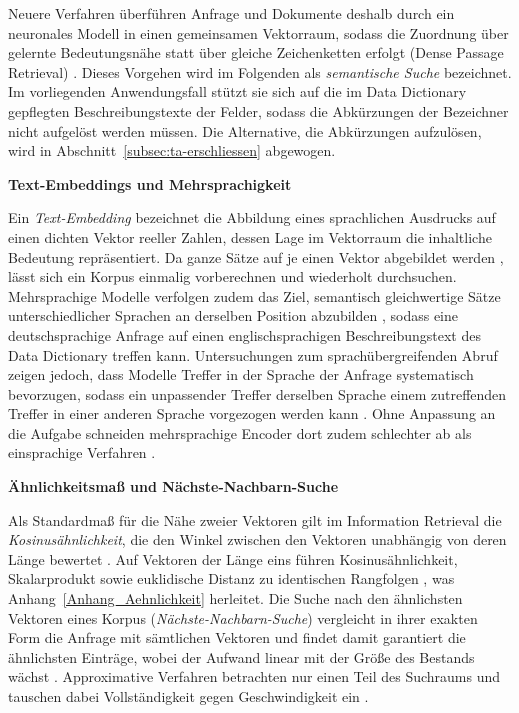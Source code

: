 Neuere Verfahren überführen Anfrage und Dokumente deshalb durch ein neuronales Modell in einen gemeinsamen Vektorraum, sodass die Zuordnung über gelernte Bedeutungsnähe statt über gleiche Zeichenketten erfolgt (Dense Passage Retrieval) \cite{karpukhin_dense_2020}. Dieses Vorgehen wird im Folgenden als \emph{semantische Suche} bezeichnet. Im vorliegenden Anwendungsfall stützt sie sich auf die im Data Dictionary gepflegten Beschreibungstexte der Felder, sodass die Abkürzungen der Bezeichner nicht aufgelöst werden müssen. Die Alternative, die Abkürzungen aufzulösen, wird in Abschnitt~\ref{subsec:ta-erschliessen} abgewogen.

\textbf{Text-Embeddings und Mehrsprachigkeit}

Ein \emph{Text-Embedding} bezeichnet die Abbildung eines sprachlichen Ausdrucks auf einen dichten Vektor reeller Zahlen, dessen Lage im Vektorraum die inhaltliche Bedeutung repräsentiert. Da ganze Sätze auf je einen Vektor abgebildet werden \cite{reimers_sentence-bert_2019}, lässt sich ein Korpus einmalig vorberechnen und wiederholt durchsuchen. Mehrsprachige Modelle verfolgen zudem das Ziel, semantisch gleichwertige Sätze unterschiedlicher Sprachen an derselben Position abzubilden \cite{reimers_making_2020}, sodass eine deutschsprachige Anfrage auf einen englischsprachigen Beschreibungstext des Data Dictionary treffen kann. Untersuchungen zum sprachübergreifenden Abruf zeigen jedoch, dass Modelle Treffer in der Sprache der Anfrage systematisch bevorzugen, sodass ein unpassender Treffer derselben Sprache einem zutreffenden Treffer in einer anderen Sprache vorgezogen werden kann \cite{roy_lareqa_2020}. Ohne Anpassung an die Aufgabe schneiden mehrsprachige Encoder dort zudem schlechter ab als einsprachige Verfahren \cite{litschko_cross-lingual_2021}.

\textbf{Ähnlichkeitsmaß und Nächste-Nachbarn-Suche}

Als Standardmaß für die Nähe zweier Vektoren gilt im Information Retrieval die \emph{Kosinusähnlichkeit}, die den Winkel zwischen den Vektoren unabhängig von deren Länge bewertet \cite{manning_introduction_2008}. Auf Vektoren der Länge eins führen Kosinusähnlichkeit, Skalarprodukt sowie euklidische Distanz zu identischen Rangfolgen \cite{manning_introduction_2008}, was Anhang~\ref{Anhang_Aehnlichkeit} herleitet. Die Suche nach den ähnlichsten Vektoren eines Korpus (\emph{Nächste-Nachbarn-Suche}) vergleicht in ihrer exakten Form die Anfrage mit sämtlichen Vektoren und findet damit garantiert die ähnlichsten Einträge, wobei der Aufwand linear mit der Größe des Bestands wächst \cite{douze_faiss_2025}. Approximative Verfahren betrachten nur einen Teil des Suchraums und tauschen dabei Vollständigkeit gegen Geschwindigkeit ein \cite{malkov_efficient_2018}.

